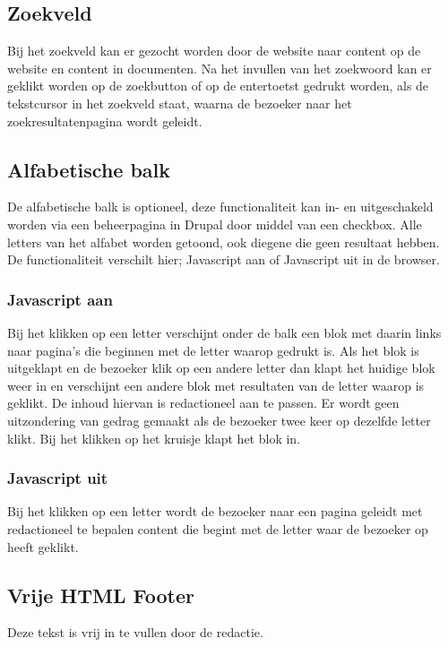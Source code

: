 \subsection{Zoekveld}
\label{sec:zoekveld}
Bij het zoekveld kan er gezocht worden door de website naar content op de website en content in documenten. Na het invullen van het zoekwoord kan er geklikt worden op de zoekbutton of op de entertoetst gedrukt worden, als de tekstcursor in het zoekveld staat, waarna de bezoeker naar het zoekresultatenpagina wordt geleidt. 

\subsection{Alfabetische balk}
\label{sec:alfabetischebalk}
De alfabetische balk is optioneel, deze functionaliteit kan in- en uitgeschakeld worden via een beheerpagina in Drupal door middel van een checkbox. Alle letters van het alfabet worden getoond, ook diegene die geen resultaat hebben. De functionaliteit verschilt hier; Javascript aan of Javascript uit in de browser.

\subsubsection{Javascript aan}
Bij het klikken op een letter verschijnt onder de balk een blok met daarin links naar pagina's die beginnen met de letter waarop gedrukt is. Als het blok is uitgeklapt en de bezoeker klik op een andere letter dan klapt het huidige blok weer in en verschijnt een andere blok met resultaten van de letter waarop is geklikt. De inhoud hiervan is redactioneel aan te passen. Er wordt geen uitzondering van gedrag gemaakt als de bezoeker twee keer op dezelfde letter klikt. Bij het klikken op het kruisje klapt het blok in.

\subsubsection{Javascript uit}
Bij het klikken op een letter wordt de bezoeker naar een pagina geleidt met redactioneel te bepalen content die begint met de letter waar de bezoeker op heeft geklikt.

\subsection{Vrije HTML Footer}
\label{sec:vrijehtmlfooter}
Deze tekst is vrij in te vullen door de redactie.

